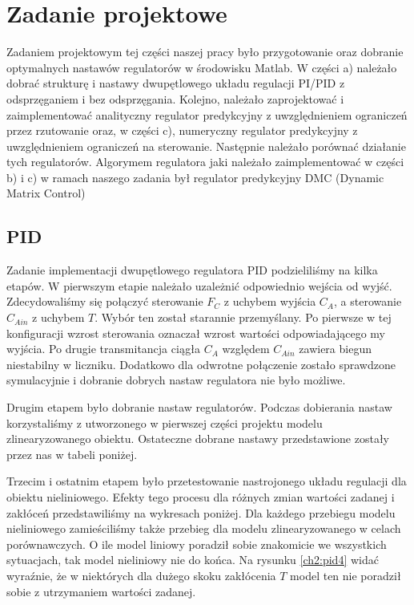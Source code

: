 \chapter{Zadanie projektowe}

Zadaniem projektowym tej części naszej pracy było przygotowanie oraz dobranie optymalnych nastawów regulatorów w środowisku Matlab. W części a) należało dobrać strukturę i nastawy dwupętlowego układu regulacji PI/PID z odsprzęganiem i bez odsprzęgania. Kolejno, należało zaprojektować i zaimplementować analityczny regulator predykcyjny z uwzględnieniem ograniczeń przez rzutowanie oraz, w części c), numeryczny regulator predykcyjny z uwzględnieniem ograniczeń na sterowanie. Następnie należało porównać działanie tych regulatorów. Algorymem regulatora jaki należało zaimplementować w części b) i c) w ramach naszego zadania był regulator predykcyjny DMC (Dynamic Matrix Control)

\section{PID}
Zadanie implementacji dwupętlowego regulatora PID podzieliliśmy na kilka etapów. W pierwszym etapie należało uzależnić odpowiednio wejścia od wyjść. Zdecydowaliśmy się połączyć sterowanie $F_C$ z uchybem wyjścia $C_A$, a sterowanie $C_{Ain}$ z uchybem $T$. Wybór ten został starannie przemyślany. Po pierwsze w tej konfiguracji wzrost sterowania oznaczał wzrost wartości odpowiadającego my wyjścia. Po drugie transmitancja ciągła $C_A$ względem $C_{Ain}$ zawiera biegun niestabilny w liczniku. Dodatkowo dla odwrotne połączenie zostało sprawdzone symulacyjnie i dobranie dobrych nastaw regulatora nie było możliwe.

Drugim etapem było dobranie nastaw regulatorów. Podczas dobierania nastaw korzystaliśmy z utworzonego w pierwszej części projektu modelu zlinearyzowanego obiektu. Ostateczne dobrane nastawy przedstawione zostały przez nas w tabeli poniżej.

Trzecim i ostatnim etapem było przetestowanie nastrojonego układu regulacji dla obiektu nieliniowego. Efekty tego procesu dla różnych zmian wartości zadanej i zakłóceń przedstawiliśmy na wykresach poniżej. Dla każdego przebiegu modelu nieliniowego zamieściliśmy także przebieg dla modelu zlinearyzowanego w celach porównawczych. O ile model liniowy poradził sobie znakomicie we wszystkich sytuacjach, tak model nieliniowy nie do końca. Na rysunku \ref{ch2:pid4} widać wyraźnie, że w niektórych dla dużego skoku zakłócenia $T$ model ten nie poradził sobie z utrzymaniem wartości zadanej.

